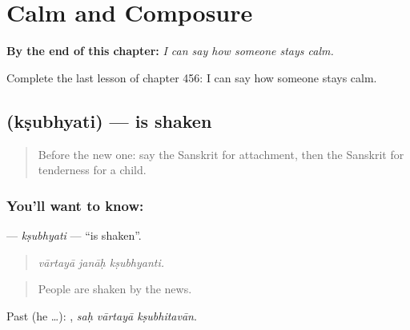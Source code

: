 
\chapter{Calm and Composure}
\label{ch:sa-calm-and-composure}

\begin{chapteropening}
\textbf{By the end of this chapter:} \emph{I can say how someone stays calm.}

Complete the last lesson of chapter 456: I can say how someone stays calm.
\end{chapteropening}

\section[\texorpdfstring{\sk{क्षुभ्यति} (kṣubhyati)}{क्षुभ्यति (kṣubhyati)}]{ (kṣubhyati) — is shaken}

\label{lesson:SA-C456-ksubhyati}



\begin{quote}
Before the new one: say the Sanskrit for attachment, then the Sanskrit for tenderness for a child.
\end{quote}

\subsection*{You'll want to know: }
\textbf{} — \emph{kṣubhyati} — \textquotedblleft{}is shaken\textquotedblright{}.

\begin{quote}
  
\end{quote}

\begin{quote}
\emph{vārtayā janāḥ kṣubhyanti.}
\end{quote}

\begin{quote}
People are shaken by the news.
\end{quote}

Past (he …):   , \emph{saḥ vārtayā kṣubhitavān}.

